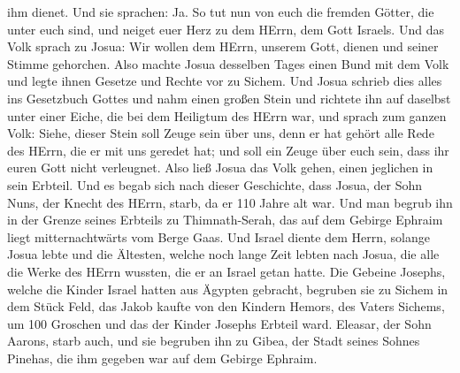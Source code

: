 ihm dienet. Und sie sprachen: Ja.  So tut nun von euch die
fremden Götter, die unter euch sind, und neiget euer Herz zu dem HErrn,
dem Gott Israels.  Und das Volk sprach zu Josua: Wir wollen
dem HErrn, unserem Gott, dienen und seiner Stimme gehorchen.
 Also machte Josua desselben Tages einen Bund mit dem Volk
und legte ihnen Gesetze und Rechte vor zu Sichem.  Und
Josua schrieb dies alles ins Gesetzbuch Gottes und nahm einen großen
Stein und richtete ihn auf daselbst unter einer Eiche, die bei dem
Heiligtum des HErrn war,  und sprach zum ganzen Volk:
Siehe, dieser Stein soll Zeuge sein über uns, denn er hat gehört alle
Rede des HErrn, die er mit uns geredet hat; und soll ein Zeuge über euch
sein, dass ihr euren Gott nicht verleugnet.  Also ließ
Josua das Volk gehen, einen jeglichen in sein Erbteil.  Und
es begab sich nach dieser Geschichte, dass Josua, der Sohn Nuns, der
Knecht des HErrn, starb, da er 110 Jahre alt war.  Und man
begrub ihn in der Grenze seines Erbteils zu Thimnath-Serah, das auf dem
Gebirge Ephraim liegt mitternachtwärts vom Berge Gaas.  Und
Israel diente dem Herrn, solange Josua lebte und die Ältesten, welche
noch lange Zeit lebten nach Josua, die alle die Werke des HErrn wussten,
die er an Israel getan hatte.  Die Gebeine Josephs, welche
die Kinder Israel hatten aus Ägypten gebracht, begruben sie zu Sichem in
dem Stück Feld, das Jakob kaufte von den Kindern Hemors, des Vaters
Sichems, um 100 Groschen und das der Kinder Josephs Erbteil ward.
 Eleasar, der Sohn Aarons, starb auch, und sie begruben ihn
zu Gibea, der Stadt seines Sohnes Pinehas, die ihm gegeben war auf dem
Gebirge Ephraim.
